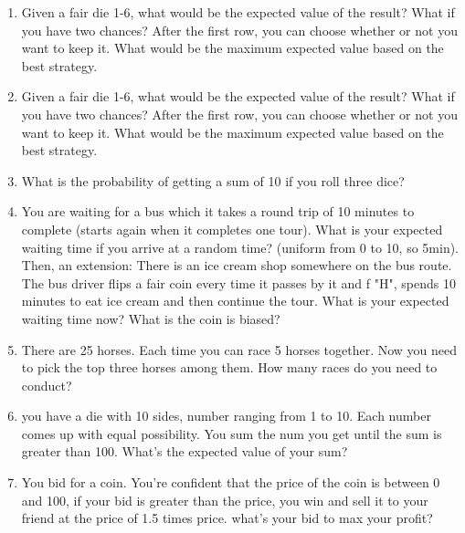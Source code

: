 \documentclass{article}
\begin{document}
\begin{enumerate}
    \item Given a fair die 1-6, what would be the expected value of the result? What if you have two chances? After the first row, you can choose whether or not you want to keep it. What would be the maximum expected value based on the best strategy.

    \item Given a fair die 1-6, what would be the expected value of the result? What if you have two chances? After the first row, you can choose whether or not you want to keep it. What would be the maximum expected value based on the best strategy.

    \item What is the probability of getting a sum of 10 if you roll three dice?

    \item You are waiting for a bus which it takes a round trip of 10 minutes to complete (starts again when it completes one tour). What is your expected waiting time if you arrive at a random time? (uniform from 0 to 10, so 5min). Then, an extension: There is an ice cream shop somewhere on the bus route. The bus driver flips a fair coin every time it passes by it and f "H", spends 10 minutes to eat ice cream and then continue the tour. What is your expected waiting time now? What is the coin is biased?

    \item There are 25 horses. Each time you can race 5 horses together. Now you need to pick the top three horses among them. How many races do you need to conduct?

    \item you have a die with 10 sides, number ranging from 1 to 10. Each number comes up with equal possibility. You sum the num you get until the sum is greater than 100. What's the expected value of your sum?

    \item You bid for a coin. You're confident that the price of the coin is between 0 and 100, if your bid is greater than the price, you win and sell it to your friend at the price of 1.5 times price. what's your bid to max your profit?
    
    

     

    
\end{enumerate}
\end{document}
